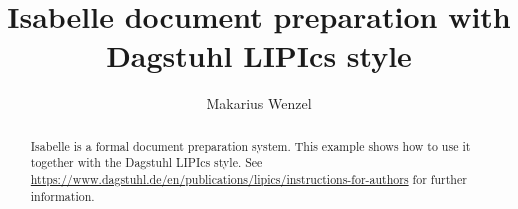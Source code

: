 \documentclass[a4paper,UKenglish,cleveref,autoref]{lipics-v2021}
\title{Isabelle document preparation with Dagstuhl LIPIcs style}
\author{Makarius Wenzel}{Augsburg, Germany \and \url{https://sketis.net}}{}{https://orcid.org/0000-0002-3753-8280}{}
\begin{document}
    \maketitle

    \begin{abstract}
        Isabelle is a formal document preparation system. This example shows how to
        use it together with the Dagstuhl LIPIcs style. See
        \url{https://www.dagstuhl.de/en/publications/lipics/instructions-for-authors}
        for further information.
    \end{abstract}

    

    
\end{document}
